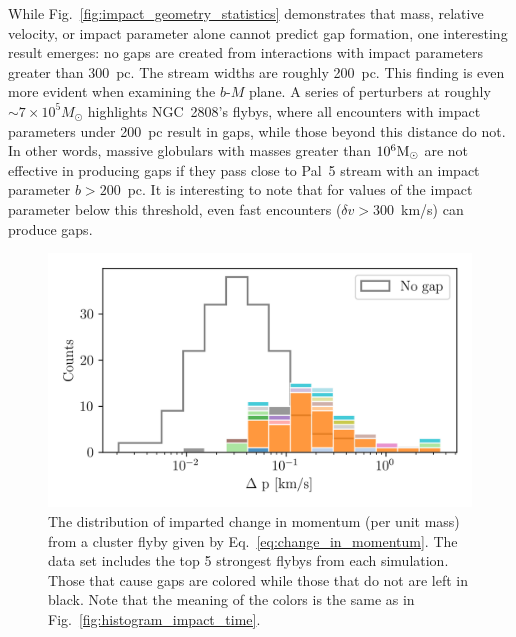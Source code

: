 \documentclass{aa}
\begin{document}
      
  
    While Fig.~\ref{fig:impact_geometry_statistics} demonstrates that mass, relative velocity, or impact parameter alone cannot predict gap formation, one interesting result emerges: no gaps are created from interactions with impact parameters greater than 300~pc. The stream widths are roughly 200~pc. This finding is even more evident when examining the $b$-$M$ plane. A series of perturbers at roughly $\sim7 \times 10^5 M_\odot$ highlights NGC~2808's flybys, where all encounters with impact parameters under 200~pc result in gaps, while those beyond this distance do not. In other words, massive globulars with masses greater than $10^6 \rm{M}_\odot$ are not effective in producing gaps if they pass close to Pal~5 stream with an impact parameter $b > 200$~pc. It is interesting to note that for values of the impact parameter below this threshold, even fast encounters ($\delta v > 300$~km/s) can produce gaps. 

    \begin{figure}
      \centering
      \includegraphics[width=1\linewidth]{impact_geometry_statistics_deltaP.png}
      \caption{The distribution of imparted  change in momentum (per unit mass) from a cluster flyby given by Eq.~\ref{eq:change_in_momentum}. The data set includes the top 5 strongest flybys from each simulation. Those that cause gaps are colored while those that do not are left in black. Note that the meaning of the colors is the same as in Fig.~\ref{fig:histogram_impact_time}.}
      \label{fig:deltap}
    \end{figure}
      
\end{document}

